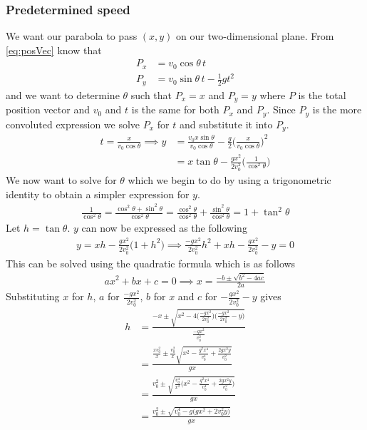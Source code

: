 \documentclass[%
aip,
jmp,
amsmath,amssymb,
reprint,%
]{revtex4-1}
\begin{document}
	\subsubsection{Predetermined speed}\label{seq:predSpeed}
	We want our parabola to pass $(x, y)$ on our two-dimensional plane. From \eqref{eq:posVec} know that
	\begin{align}\nonumber
		P_x &= v_0\cos\theta\,t\\\nonumber
		P_y &= v_0\sin\theta\,t - \frac12gt^2\nonumber
	\end{align}
	and we want to determine $\theta$ such that $P_x = x$ and $P_y = y$ where $P$ is the total position vector and $v_0$ and $t$ is the same for both $P_x$ and $P_y$. Since $P_y$ is the more convoluted expression we solve $P_x$ for $t$ and substitute it into $P_y$.
	\begin{align}\nonumber
		t=\frac{x}{v_0\cos\theta} \implies y &= \frac{v_0x\sin\theta}{v_0\cos\theta} - \frac{g}{2}\Big(\frac{x}{v_0\cos\theta}\Big)^2\\\label{eq:yOfXandTViaT}
		&= x\tan\theta-\frac{gx^2}{2v_{0}^2}\Big(\frac{1}{\cos^2\theta}\Big)
	\end{align}
	We now want to solve for $\theta$ which we begin to do by using a trigonometric identity to obtain a simpler expression for $y$.
	\begin{align}\nonumber
		\frac{1}{\cos^2\theta} = \frac{\cos^2\theta+\sin^2\theta}{\cos^2\theta} = \frac{\cos^2\theta}{\cos^2\theta} + \frac{\sin^2\theta}{\cos^2\theta} = 1+\tan^2\theta
	\end{align}
	Let $h=\tan\theta$. $y$ can now be expressed as the following
	\begin{align}\nonumber
		y=xh-\frac{gx^2}{2v_{0}^2}\big( 1+h^2\big) \implies \frac{-gx^2}{2v_{0}^2}h^2+xh-\frac{gx^2}{2v_{0}^2}-y = 0
	\end{align}
	This can be solved using the quadratic formula which is as follows
	\begin{align}\label{eq:quadFormula}
		ax^2+bx+c=0 \implies x=\frac{-b\pm\sqrt{b^2-4ac}}{2a}
	\end{align}
	Substituting $x$ for $h$, $a$ for $\frac{-gx^2}{2v_{0}^2}$, $b$ for $x$ and $c$ for $-\frac{gx^2}{2v_{0}^2}-y$ gives
	\begin{align}\nonumber
		h &= \frac{-x\pm\sqrt{x^2-4\big(\frac{-gx^2}{2v_{0}^2}\big)\big(\frac{-gx^2}{2v_{0}^2}-y\big)}}{\frac{-gx^2}{v_{0}^2}}\\\nonumber
		&= \frac{\frac{xv_{0}^2}{x}\pm\frac{v_{0}^2}{x}\sqrt{x^2-\frac{g^2x^4}{v_{0}^4}+\frac{2gx^2y}{v_{0}^2}}}{gx}\\\nonumber
		&=\frac{v_{0}^2\pm\sqrt{\frac{v_{0}^4}{x^2}\Big(x^2-\frac{g^2x^4}{v_{0}^4}+\frac{2gx^2y}{v_{0}^2}\Big)}}{gx}\\\nonumber
		&=\frac{v_{0}^2\pm\sqrt{v_{0}^4-g\big(gx^2+2v_{0}^2y\big)}}{gx}\\\nonumber
	\end{align}
\end{document}
